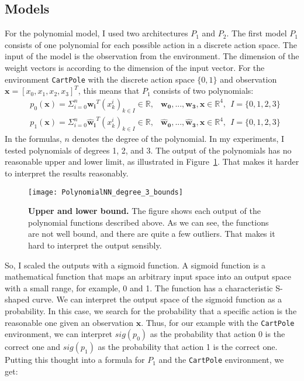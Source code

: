 
\subsection{Models}
\label{ssec:models}
For the polynomial model, I used two architectures $P_1$ and $P_2$. The first model $P_1$ consists of one polynomial for each possible action in a discrete action space. The input of the model is the observation from the environment. The dimension of the weight vectors is according to the dimension of the input vector. For the environment \verb|CartPole| with the discrete action space $\{0, 1\}$ and observation $\mathbf{x} = [x_0, x_1, x_2, x_3]^T$, this means that $P_1$ consists of two polynomials:
\begin{align*}
  &p_0(\mathbf{x}) = \Sigma_{i=0}^{n} \mathbf{w_i}^T (x_k^i)_{k \in I} \in \mathbb{R}, &\mathbf{w_0}, ..., \mathbf{w_3}, \mathbf{x} \in \mathbb{R}^4, \ \ I = \{0, 1, 2, 3\} \\
  &p_1(\mathbf{x}) = \Sigma_{i=0}^{n} \mathbf{\hat{w}_i}^T (x_k^i)_{k \in I} \in \mathbb{R}, &\mathbf{\hat{w}_0}, ..., \mathbf{\hat{w}_3}, \mathbf{x} \in \mathbb{R}^4, \ \ I = \{0, 1, 2, 3\}
\end{align*}
In the formulas, $n$ denotes the degree of the polynomial. In my experiments, I tested polynomials of degrees 1, 2, and 3. The output of the polynomials has no reasonable upper and lower limit, as illustrated in Figure~\ref{fig:bounds}. That makes it harder to interpret the results reasonably.
\begin{figure}[ht]
\centering
\texttt{[image: PolynomialNN\_degree\_3\_bounds]}
\caption[Upper and lower bound]{
  \textbf{Upper and lower bound.}
  The figure shows each output of the polynomial functions described above. As we can see, the functions are not well bound, and there are quite a few outliers. That makes it hard to interpret the output sensibly.
}
\label{fig:bounds}
\end{figure}
So, I scaled the outputs with a sigmoid function. A sigmoid function is a mathematical function that maps an arbitrary input space into an output space with a small range, for example, 0 and 1. The function has a characteristic S-shaped curve. We can interpret the output space of the sigmoid function as a probability. In this case, we search for the probability that a specific action is the reasonable one given an observation $\mathbf{x}$. Thus, for our example with the \verb|CartPole| environment, we can interpret $sig(p_0)$ as the probability that action 0 is the correct one and $sig(p_1)$ as the probability that action 1 is the correct one. Putting this thought into a formula for $P_1$ and the \verb|CartPole| environment, we get:
